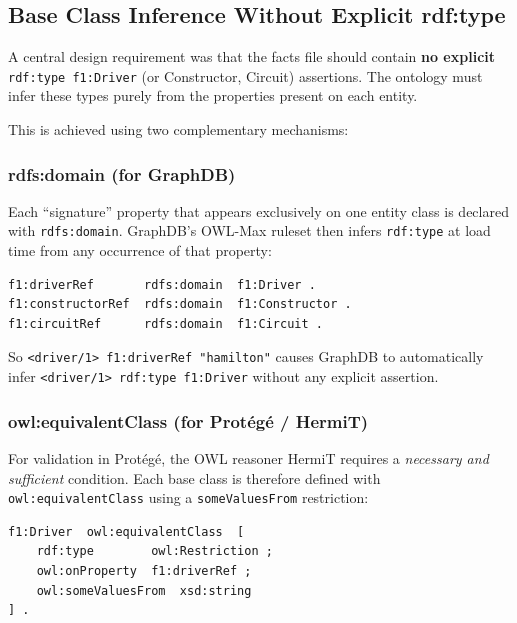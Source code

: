 \documentclass[12pt,a4paper]{article}
\begin{document}
\subsection{Base Class Inference Without Explicit rdf:type}

A central design requirement was that the facts file should contain \textbf{no explicit}
\texttt{rdf:type f1:Driver} (or Constructor, Circuit) assertions. The ontology must
infer these types purely from the properties present on each entity.

This is achieved using two complementary mechanisms:

\subsubsection{rdfs:domain (for GraphDB)}

Each ``signature'' property that appears exclusively on one entity class is declared
with \texttt{rdfs:domain}. GraphDB's OWL-Max ruleset then infers \texttt{rdf:type} at
load time from any occurrence of that property:

\begin{lstlisting}[style=turtle, caption={rdfs:domain declarations as inference anchors}]
f1:driverRef       rdfs:domain  f1:Driver .
f1:constructorRef  rdfs:domain  f1:Constructor .
f1:circuitRef      rdfs:domain  f1:Circuit .
\end{lstlisting}

So \texttt{<driver/1> f1:driverRef "hamilton"} causes GraphDB to automatically
infer \texttt{<driver/1> rdf:type f1:Driver} without any explicit assertion.

\subsubsection{owl:equivalentClass (for Protégé / HermiT)}

For validation in Protégé, the OWL reasoner HermiT requires a
\emph{necessary and sufficient} condition. Each base class is therefore defined with
\texttt{owl:equivalentClass} using a \texttt{someValuesFrom} restriction:

\begin{lstlisting}[style=turtle, caption={Bidirectional equivalentClass definition for Driver}]
f1:Driver  owl:equivalentClass  [
    rdf:type        owl:Restriction ;
    owl:onProperty  f1:driverRef ;
    owl:someValuesFrom  xsd:string
] .
\end{lstlisting}
\end{document}
